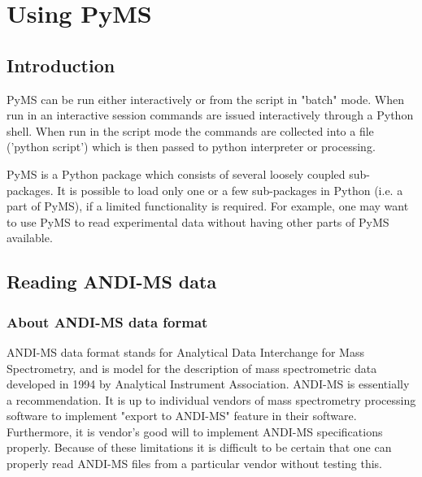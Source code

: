 

\chapter{Using PyMS}

\section{Introduction}

PyMS can be run either interactively or from the script in "batch" mode.
When run in an interactive session commands are issued interactively through
a Python shell. When run in the script mode the commands are collected
into a file ('python script') which is then passed to python interpreter
or processing.

PyMS is a Python package which consists of several loosely coupled
sub-packages. It is possible to load only one or a few sub-packages
in Python (i.e. a part of PyMS), if a limited functionality is required.
For example, one may want to use PyMS to read experimental data without
having other parts of PyMS available.

\section{Reading ANDI-MS data}

\subsection{About ANDI-MS data format}

ANDI-MS data format stands for Analytical Data Interchange for Mass
Spectrometry, and is model for the description of mass spectrometric
data developed in 1994 by Analytical Instrument Association. ANDI-MS 
is essentially a recommendation. It is up to individual vendors of
mass spectrometry processing software to implement "export to ANDI-MS"
feature in their software. Furthermore, it is vendor's good will to
implement ANDI-MS specifications properly. Because of these limitations
it is difficult to be certain that one can properly read ANDI-MS
files from a particular vendor without testing this.

